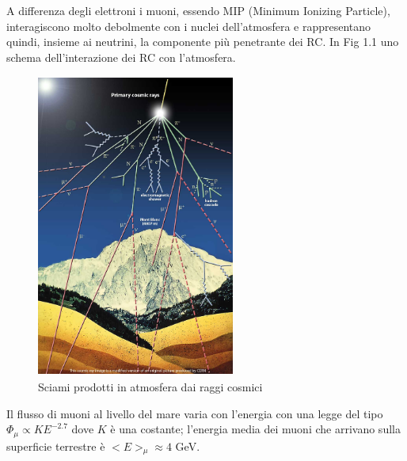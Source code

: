 \documentclass{standalone}
\begin{document}
A differenza degli elettroni i muoni, essendo MIP (Minimum Ionizing Particle), interagiscono molto debolmente con i nuclei dell'atmosfera e rappresentano quindi, insieme ai neutrini, la componente più penetrante dei RC. In Fig 1.1 uno schema dell'interazione dei RC con l'atmosfera.

\begin{figure}[t]
	\centering
	\includegraphics[width=6.5cm, height=10cm]{images/cosmic-rays.jpg}
	\caption{Sciami prodotti in atmosfera dai raggi cosmici}
\end{figure}


Il flusso di muoni al livello del mare varia con l'energia con una legge del tipo $\Phi_\mu \propto KE^{-2.7}$ dove $K$ è una costante; l'energia media dei muoni che arrivano sulla superficie terrestre è $<E>_\mu \approx 4$ GeV.
\clearpage
\end{document}
